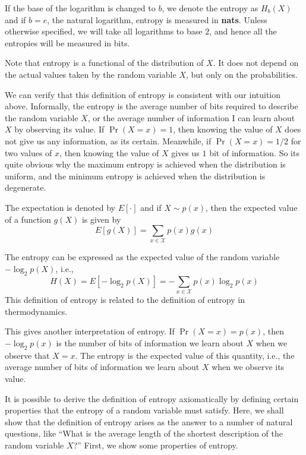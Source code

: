 \documentclass[../main.tex]{subfiles}
\begin{document}
If the base of the logarithm is changed to $b$, we denote the entropy as $H_b(X)$ and if $b=e$, the natural logarithm, entropy is measured in \textbf{nats}. Unless otherwise specified, we will take all logarithms to base $2$, and hence all the entropies will be measured in bits.

\begin{remark}
  Note that entropy is a functional of the distribution of $X$. It does not depend on the actual values taken by the random variable $X$, but only on the probabilities. 

  We can verify that this definition of entropy is consistent with our intuition above. Informally, the entropy is the average number of bits required to describe the random variable $X$, or the average number of information I can learn about $X$ by observing its value. If $\Pr(X=x) = 1$, then knowing the value of $X$ does not give us any information, as its certain. Meanwhile, if $\Pr(X=x) = 1/2$ for two values of $x$, then knowing the value of $X$ gives us $1$ bit of information. So its quite obvious why the maximum entropy is achieved when the distribution is uniform, and the minimum entropy is achieved when the distribution is degenerate.
\end{remark}

The expectation is denoted by $E[\cdot]$ and if $X \sim p(x)$, then the expected value of a function $g(X)$ is given by
\begin{equation*}
  E[g(X)] = \sum_{x \in \mathcal{X}} p(x) g(x)
\end{equation*}

\begin{remark}
  The entropy can be expressed as the expected value of the random variable $-\log_2 p(X)$, i.e.,
  \begin{equation}
    H(X) = E[-\log_2 p(X)] = -\sum_{x \in \mathcal{X}} p(x) \log_2 p(x)
  \end{equation}
  This definition of entropy is related to the definition of entropy in thermodynamics.

  This gives another interpretation of entropy. If $\Pr(X=x) = p(x)$, then $-\log_2 p(x)$ is the number of bits of information we learn about $X$ when we observe that $X=x$. The entropy is the expected value of this quantity, i.e., the average number of bits of information we learn about $X$ when we observe its value.
\end{remark}

It is possible to derive the definition of entropy axiomatically by defining certain properties that the entropy of a random variable must satisfy. Here, we shall show that the definition of entropy arises as the answer to a number of natural questions, like ``What is the average length of the shortest description of the random variable $X$?'' First, we show some properties of entropy.
\end{document}
